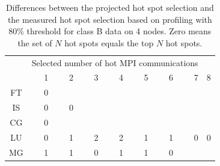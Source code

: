 \begin{table}
\begin{center}
\begin{tabular}{c|r|r|r|r|r|r|r|r}
\hline
&\multicolumn{7}{c}{Selected number of hot MPI communications}\\
        & 1 & 2 & 3 & 4 & 5 & 6 & 7 & 8 \\
\hline
FT      & 0 &   &   &   &   &   &   &   \\  %
IS      & 0 & 0 &   &   &   &   &   &   \\  %
CG      & 0 &   &   &   &   &   &   &   \\  %
LU      & 0 & 1 & 2 & 2 & 1 & 1 & 0 & 0 \\  %
MG      & 1 & 1 & 0 & 1 & 1 & 0 &   &   \\  %
\hline
\hline
\end{tabular}
\end{center}
\caption{
Differences between the projected hot spot selection and
the measured hot spot selection based on profiling with 80\% threshold for class B data on 4 nodes. Zero means
the set of $N$ hot spots equals the top $N$ hot spots.
}%
\label{tab:npb:hot}
\end{table}



